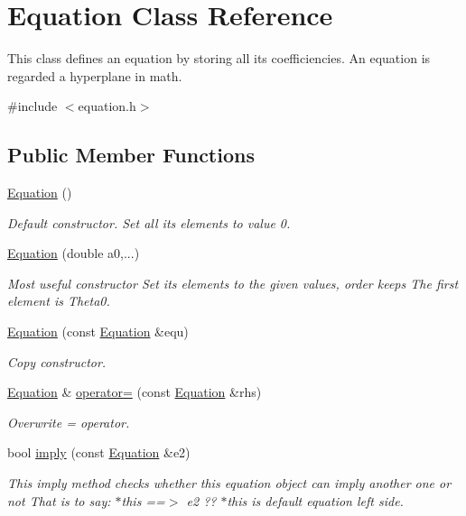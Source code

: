 \hypertarget{classEquation}{}\section{Equation Class Reference}
\label{classEquation}


This class defines an equation by storing all its coefficiencies. An equation is regarded a hyperplane in math.  




{\ttfamily \#include $<$equation.\+h$>$}

\subsection*{Public Member Functions}
\begin{DoxyCompactItemize}
\item 
\hyperlink{classEquation_a68511fc719250ed80f86c50de9136733}{Equation} ()
\begin{DoxyCompactList}\small\item\em Default constructor. Set all its elements to value 0. \end{DoxyCompactList}\item 
\hyperlink{classEquation_a2899879892ff76b229b4f11c0ec1de78}{Equation} (double a0,...)
\begin{DoxyCompactList}\small\item\em Most useful constructor Set its elements to the given values, order keeps The first element is Theta0. \end{DoxyCompactList}\item 
\hyperlink{classEquation_a81aaa52692da38c62bb684186912d91c}{Equation} (const \hyperlink{classEquation}{Equation} \&equ)
\begin{DoxyCompactList}\small\item\em Copy constructor. \end{DoxyCompactList}\item 
\hyperlink{classEquation}{Equation} \& \hyperlink{classEquation_a114154c932768fbe0e3587c10c44071d}{operator=} (const \hyperlink{classEquation}{Equation} \&rhs)
\begin{DoxyCompactList}\small\item\em Overwrite = operator. \end{DoxyCompactList}\item 
bool \hyperlink{classEquation_a0e6c0d52385361a604b5a8cab3d42e5e}{imply} (const \hyperlink{classEquation}{Equation} \&e2)
\begin{DoxyCompactList}\small\item\em This imply method checks whether this equation object can imply another one or not That is to say\+: $\ast$this ==$>$ e2 ?? $\ast$this is default equation left side. \end{DoxyCompactList}\item 

\end{DoxyCompactItemize}
